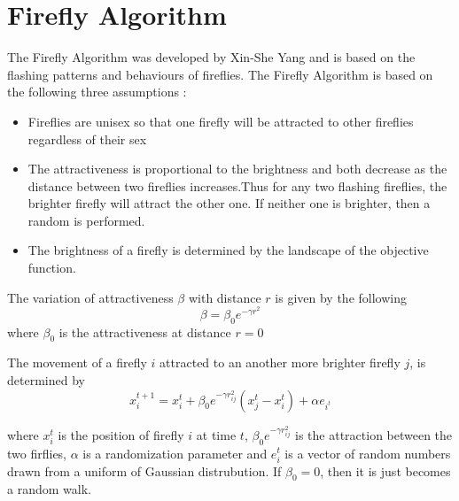 \documentclass[a4paper]{article}
\begin{document}
\section*{Firefly Algorithm}

The Firefly Algorithm was developed by Xin-She Yang and is based on the flashing patterns and behaviours of fireflies.
The Firefly Algorithm is based on the following three assumptions :
\begin{itemize}
    \item Fireflies are unisex so that one firefly will be attracted to other fireflies regardless of their sex\
    \item The attractiveness is proportional to the brightness and both decrease as the distance between two fireflies increases.Thus for any two flashing fireflies, the brighter firefly will attract the other one. If neither one is brighter, then a random is performed.
    \item The brightness of a firefly is determined by the landscape of the objective function.
\end{itemize}

The variation of attractiveness $\beta$ with distance $r$ is given by the following
\begin{equation}
    \beta = \beta_{0} e^{-\gamma r^2}
\end{equation} 
where $\beta_{0} $ is the attractiveness at distance $r=0$

The movement of a firefly $i$ attracted to an another more brighter firefly $j$, is determined by 
\begin{equation}
    x_{i}^{t+1} = x_{i}^{t}  + \beta_{0} e^{-\gamma r_{ij}^{2} }(x_{j}^{t} - x_{i}^{t}) + \alpha e_{i ^ t}
\end{equation}

where $x_{i}^{t}$ is the position of firefly $i$ at time $t$, $\beta_{0} e^{-\gamma r_{ij}^{2} }$ is the attraction between the two firflies, $\alpha$ is a randomization parameter and $e_{i}^{t}$ is a vector of random numbers
drawn from a uniform of Gaussian distrubution. If $\beta_{0} = 0$, then it is just becomes a  random walk.
\end{document}
